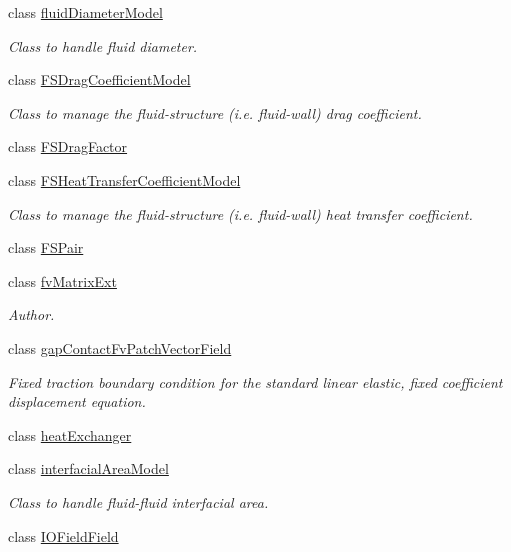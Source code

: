 \begin{DoxyCompactItemize}
class \hyperlink{classFoam_1_1fluidDiameterModel}{fluid\+Diameter\+Model}
\begin{DoxyCompactList}\small\item\em Class to handle fluid diameter. \end{DoxyCompactList}\item 
class \hyperlink{classFoam_1_1FSDragCoefficientModel}{F\+S\+Drag\+Coefficient\+Model}
\begin{DoxyCompactList}\small\item\em Class to manage the fluid-\/structure (i.\+e. fluid-\/wall) drag coefficient. \end{DoxyCompactList}\item 
class \hyperlink{classFoam_1_1FSDragFactor}{F\+S\+Drag\+Factor}
\item 
class \hyperlink{classFoam_1_1FSHeatTransferCoefficientModel}{F\+S\+Heat\+Transfer\+Coefficient\+Model}
\begin{DoxyCompactList}\small\item\em Class to manage the fluid-\/structure (i.\+e. fluid-\/wall) heat transfer coefficient. \end{DoxyCompactList}\item 
class \hyperlink{classFoam_1_1FSPair}{F\+S\+Pair}
\item 
class \hyperlink{classFoam_1_1fvMatrixExt}{fv\+Matrix\+Ext}
\begin{DoxyCompactList}\small\item\em Author. \end{DoxyCompactList}\item 
class \hyperlink{classFoam_1_1gapContactFvPatchVectorField}{gap\+Contact\+Fv\+Patch\+Vector\+Field}
\begin{DoxyCompactList}\small\item\em Fixed traction boundary condition for the standard linear elastic, fixed coefficient displacement equation. \end{DoxyCompactList}\item 
class \hyperlink{classFoam_1_1heatExchanger}{heat\+Exchanger}
\item 
class \hyperlink{classFoam_1_1interfacialAreaModel}{interfacial\+Area\+Model}
\begin{DoxyCompactList}\small\item\em Class to handle fluid-\/fluid interfacial area. \end{DoxyCompactList}\item 
class \hyperlink{classFoam_1_1IOFieldField}{I\+O\+Field\+Field}

\end{DoxyCompactItemize}
